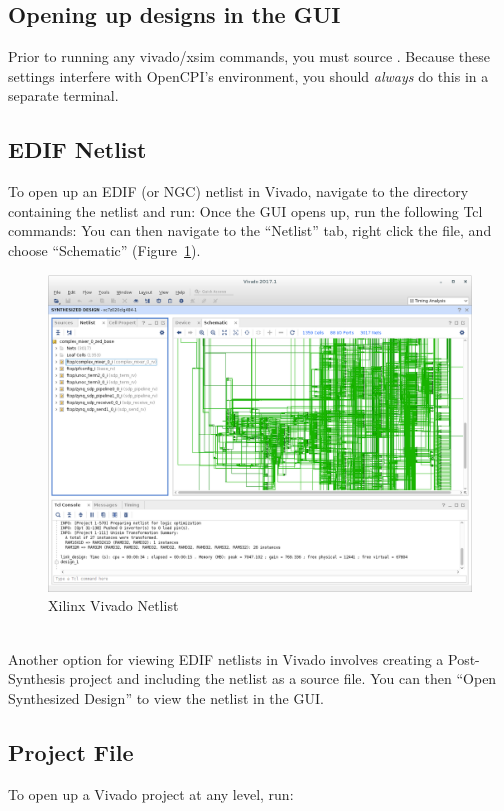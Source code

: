 \begin{flushleft}
\section{Opening up designs in the GUI}
Prior to running any vivado/xsim commands, you must source . Because these settings interfere with OpenCPI's environment, you should \textit{always} do this in a separate terminal.

\subsection{EDIF Netlist}
To open up an EDIF (or NGC) netlist in Vivado, navigate to the directory containing the netlist and run:
\newline
Once the GUI opens up, run the following Tcl commands:
You can then navigate to the ``Netlist'' tab, right click the file, and choose ``Schematic'' (Figure~\ref{fig:edif}). \\
\begin{figure}[H]
	\centerline{\includegraphics[scale=0.4]{figures/xilinx_vivado_netlist}}
	\caption{Xilinx Vivado Netlist}
	\label{fig:edif}
\end{figure}
~\\
Another option for viewing EDIF netlists in Vivado involves creating a Post-Synthesis project and including the netlist as a source file. You can then ``Open Synthesized Design'' to view the netlist in the GUI.
\subsection{Project File}
To open up a Vivado project at any level, run:\newline
{}\newline


\end{flushleft}
